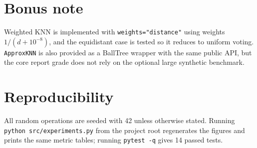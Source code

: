 \documentclass[10pt,a4paper]{article}
\begin{document}
\section*{Bonus note}
Weighted KNN is implemented with \texttt{weights="distance"} using weights $1/(d+10^{-8})$, and the equidistant case is tested so it reduces to uniform voting. \texttt{ApproxKNN} is also provided as a BallTree wrapper with the same public API, but the core report grade does not rely on the optional large synthetic benchmark.

\section*{Reproducibility}
All random operations are seeded with 42 unless otherwise stated. Running \texttt{python src/experiments.py} from the project root regenerates the figures and prints the same metric tables; running \texttt{pytest -q} gives 14 passed tests.
\end{document}
